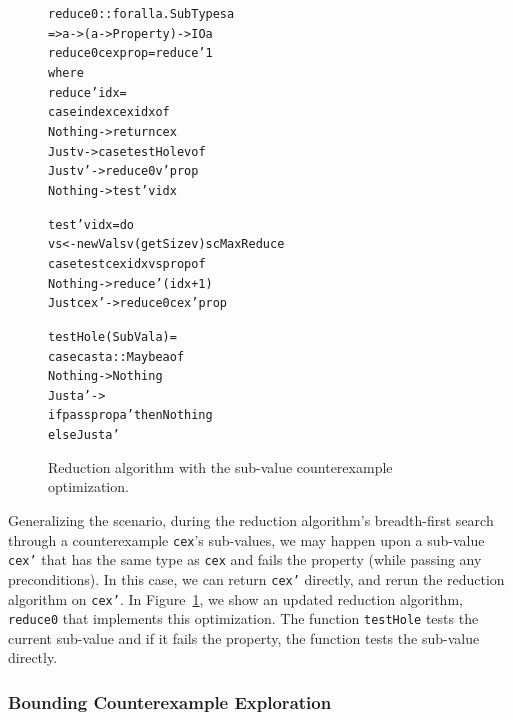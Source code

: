 \documentclass[10pt]{sigplanconf}
\newenvironment{code}{\begin{alltt}}{\end{alltt}}
\newcommand{\ttp}[1]{\texttt{#1}}
\begin{document}

\begin{figure}
\begin{code}
reduce0 :: forall a . SubTypes a
        => a -> (a -> Property) -> IO a
reduce0 cex prop = reduce' 1
  where
  reduce' idx =
    case index cex idx of
      Nothing -> return cex
      Just v  -> case testHole v of
                   Just v' -> reduce0 v' prop
                   Nothing -> test' v idx

  test' v idx = do
    vs <- newVals v (getSize v) scMaxReduce
    case test cex idx vs prop of
      Nothing   -> reduce' (idx+1)
      Just cex' -> reduce0 cex' prop

  testHole (SubVal a) =
    case cast a :: Maybe a of
      Nothing -> Nothing
      Just a' ->
        if pass prop a' then Nothing
          else Just a'
\end{code}
  \caption{Reduction algorithm with the sub-value counterexample optimization.}
  \label{fig:reduce0}
\end{figure}

Generalizing the scenario, during the reduction algorithm's breadth-first
search through a counterexample \ttp{cex}'s sub-values, we may happen upon a
sub-value \ttp{cex'} that has the same type as \ttp{cex} and fails the property
(while passing any preconditions).  In this case, we can return \ttp{cex'}
directly, and rerun the reduction algorithm on \ttp{cex'}.  In
Figure~\ref{fig:reduce0}, we show an updated reduction algorithm, \ttp{reduce0}
that implements this optimization.  The function \ttp{testHole} tests the
current sub-value and if it fails the property, the function tests the sub-value
directly.


\subsubsection{Bounding Counterexample Exploration}
\end{document}
